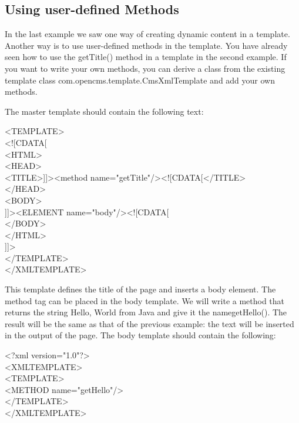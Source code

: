 \subsection{Using user-defined Methods}
In the last example we saw one way of creating dynamic content in a
template. Another way is to use user-defined methods in the template.
You have already seen how to use the {\meth getTitle(}) method in a template in
the second example. If you want to write your own methods, you can
derive a class from the existing template class
{\class com.opencms.template.Cms\-Xml\-Template} and add your own methods.

The master template should contain the following text:

\begin{xml}
<TEMPLATE>\\
\xtaba  <![CDATA[\\
\xtaba  <HTML>\\
\xtabb    <HEAD>\\
\xtabb    <TITLE>]]><method name="getTitle"/><![CDATA[</TITLE>\\
\xtabb    </HEAD>\\
\xtabb    <BODY>\\
\xtabb    ]]><ELEMENT name="body"/><![CDATA[\\
\xtabb    </BODY>\\
\xtaba  </HTML>\\
\xtaba  ]]>\\
</TEMPLATE>\\
</XMLTEMPLATE>\\
\end{xml}

This template defines the title of the page and inserts a body element.
The method tag can be placed in the body template. We will write a
method that returns the string {\name Hello, World from Java} and give it the
name{\meth getHello(}). The result will be the same as that of the previous
example: the text will be inserted in the output of the page. The body
template should contain the following:

\begin{xml}
<?xml version="1.0"?>\\
<XMLTEMPLATE>\\
<TEMPLATE>\\
<METHOD name="getHello"/>\\
</TEMPLATE>\\
</XMLTEMPLATE>\\
\end{xml}

